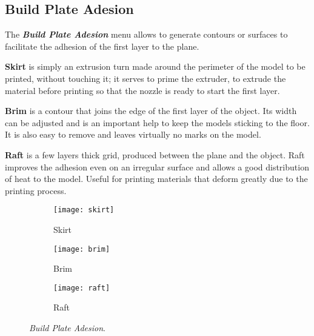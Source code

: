\newpage
	
\subsection{Build Plate Adesion}
The \emph{\textbf{Build Plate Adesion}} menu allows to generate contours or surfaces to facilitate the adhesion of the first layer to the plane.

\textbf{Skirt} is simply an extrusion turn made around the perimeter of the model to be printed, without touching it; it serves to prime the extruder, to extrude the material before printing so that the nozzle is ready to start the first layer.

\textbf{Brim} is a contour that joins the edge of the first layer of the object. Its width can be adjusted and is an important help to keep the models sticking to the floor. It is also easy to remove and leaves virtually no marks on the model.

\textbf{Raft} is a few layers thick grid, produced between the plane and the object. Raft improves the adhesion even on an irregular surface and allows a good distribution of heat to the model. Useful for printing materials that deform greatly due to the printing process.

\begin{figure}[h]

\begin{subfigure}{0.3\textwidth}
\centering
\texttt{[image: skirt]} 
\caption{Skirt}
\label{fig:skirt}
\end{subfigure}
\begin{subfigure}{0.3\textwidth}
\centering
\texttt{[image: brim]}
\caption{Brim}
\label{fig:brim}
\end{subfigure}
\begin{subfigure}{0.3\textwidth}
\centering
\texttt{[image: raft]}
\caption{Raft}
\label{fig:raft}
\end{subfigure}

\caption{\emph{Build Plate Adesion}.}
\label{fig:Build Plate Adesion}
\end{figure}
\vspace{-10pt}



